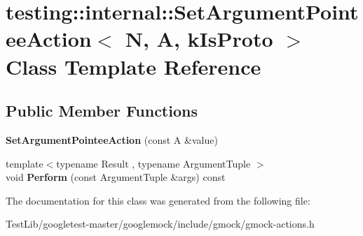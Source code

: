 \hypertarget{classtesting_1_1internal_1_1SetArgumentPointeeAction}{}\section{testing\+:\+:internal\+:\+:Set\+Argument\+Pointee\+Action$<$ N, A, k\+Is\+Proto $>$ Class Template Reference}
\label{classtesting_1_1internal_1_1SetArgumentPointeeAction}
\subsection*{Public Member Functions}
\begin{DoxyCompactItemize}
\item 
\mbox{\label{classtesting_1_1internal_1_1SetArgumentPointeeAction_a5a4119ed113667bd4a003ab0bec2cdff}} 
{\bfseries Set\+Argument\+Pointee\+Action} (const A \&value)
\item 
\mbox{\label{classtesting_1_1internal_1_1SetArgumentPointeeAction_a128320dcf991ff7f1a0087dab38b4014}} 
{\footnotesize template$<$typename Result , typename Argument\+Tuple $>$ }\\void {\bfseries Perform} (const Argument\+Tuple \&args) const
\end{DoxyCompactItemize}


The documentation for this class was generated from the following file\+:\begin{DoxyCompactItemize}
\item 
Test\+Lib/googletest-\/master/googlemock/include/gmock/gmock-\/actions.\+h\end{DoxyCompactItemize}
